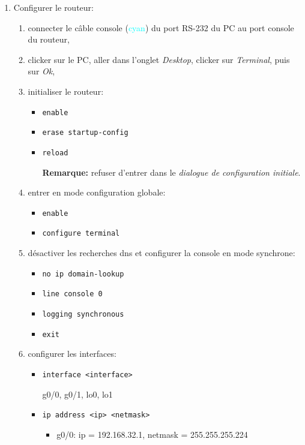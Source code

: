 \documentclass[a4paper]{article}
\begin{document}
\begin{enumerate}
\item Configurer le routeur:
\begin{enumerate}
    \item connecter le câble console (\textcolor{cyan}{cyan}) du port RS-232 du PC au port console du routeur,
    \item clicker sur le PC, aller dans l'onglet \textit{Desktop}, clicker sur \textit{Terminal}, puis sur \textit{Ok},
    \item initialiser le routeur:
    \begin{itemize}
        \item \texttt{enable}
        \item \texttt{erase startup-config}
        \item \texttt{reload}
        \begin{example}
            \textbf{Remarque:} refuser d'entrer dans le \textit{dialogue de configuration initiale}.
        \end{example}
    \end{itemize}
    \item entrer en mode configuration globale:
    \begin{itemize}
        \item \texttt{enable}
        \item \texttt{configure terminal}
    \end{itemize}
    \item désactiver les recherches dns et configurer la console en mode synchrone:
    \begin{itemize}
        \item \texttt{no ip domain-lookup}
        \item \texttt{line console 0}
        \item \texttt{logging synchronous}
        \item \texttt{exit}
    \end{itemize}
    \item configurer les interfaces:
    \begin{itemize}
        \item \texttt{interface <interface>}
        \begin{example}
            g0/0, g0/1, lo0, lo1
        \end{example}
        \item \texttt{ip address <ip> <netmask>}
        \begin{example}
            \begin{itemize}
                \item g0/0: ip = 192.168.32.1, netmask = 255.255.255.224

\end{itemize}
\end{example}
\end{itemize}
\end{enumerate}
\end{enumerate}
\end{document}
